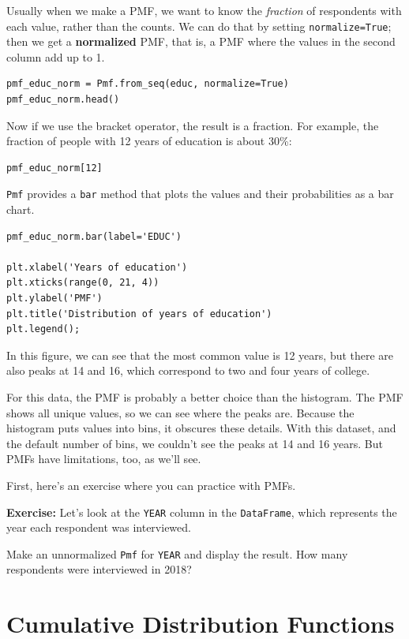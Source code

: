 Usually when we make a PMF, we want to know the \emph{fraction} of
respondents with each value, rather than the counts. We can do that by
setting \passthrough{\lstinline!normalize=True!}; then we get a
\textbf{normalized} PMF, that is, a PMF where the values in the second
column add up to 1.

\begin{lstlisting}[]
pmf_educ_norm = Pmf.from_seq(educ, normalize=True)
pmf_educ_norm.head()
\end{lstlisting}

Now if we use the bracket operator, the result is a fraction. For
example, the fraction of people with 12 years of education is about
30\%:

\begin{lstlisting}[]
pmf_educ_norm[12]
\end{lstlisting}

\passthrough{\lstinline!Pmf!} provides a \passthrough{\lstinline!bar!}
method that plots the values and their probabilities as a bar chart.

\begin{lstlisting}[]
pmf_educ_norm.bar(label='EDUC')

plt.xlabel('Years of education')
plt.xticks(range(0, 21, 4))
plt.ylabel('PMF')
plt.title('Distribution of years of education')
plt.legend();
\end{lstlisting}

In this figure, we can see that the most common value is 12 years, but
there are also peaks at 14 and 16, which correspond to two and four
years of college.

For this data, the PMF is probably a better choice than the histogram.
The PMF shows all unique values, so we can see where the peaks are.
Because the histogram puts values into bins, it obscures these details.
With this dataset, and the default number of bins, we couldn't see the
peaks at 14 and 16 years. But PMFs have limitations, too, as we'll see.

First, here's an exercise where you can practice with PMFs.

\textbf{Exercise:} Let's look at the \passthrough{\lstinline!YEAR!}
column in the \passthrough{\lstinline!DataFrame!}, which represents the
year each respondent was interviewed.

Make an unnormalized \passthrough{\lstinline!Pmf!} for
\passthrough{\lstinline!YEAR!} and display the result. How many
respondents were interviewed in 2018?

\hypertarget{cumulative-distribution-functions}{%
\section{Cumulative Distribution
Functions}\label{cumulative-distribution-functions}}

